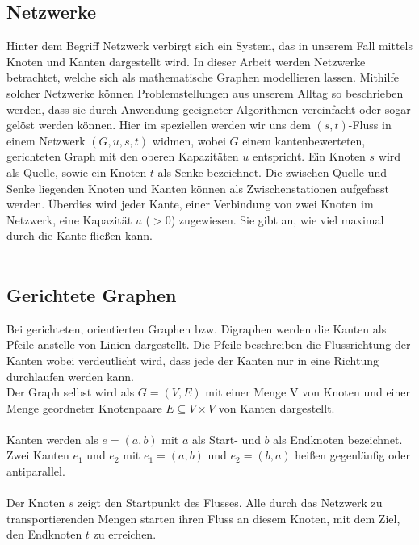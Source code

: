 \documentclass[a4paper]{llncs}
\begin{document}
\subsection{Netzwerke}
\label{Netzwerke}
Hinter dem Begriff Netzwerk verbirgt sich ein System, das in unserem Fall mittels Knoten und Kanten dargestellt wird. In dieser Arbeit werden Netz\-werke betrachtet, welche sich als mathematische Graphen modellieren lassen. Mithilfe solcher Netzwerke können Problemstellungen aus unserem Alltag so beschrieben werden, dass sie durch Anwendung geeigneter Algorithmen ver\-einfacht oder sogar gelöst werden können. Hier im speziellen werden wir uns dem $(s,t)$-Fluss in einem Netzwerk $(G,u,s,t)$ widmen, wobei  $G$ einem kanten\-bewerteten, gerichteten Graph mit den oberen Kapazitäten $u$ entspricht. Ein Knoten $s$ wird als Quelle, sowie ein Knoten $t$ als Senke bezeichnet. Die zwischen Quelle und Senke liegenden Knoten und Kanten können als Zwischenstationen aufgefasst werden. Überdies wird jeder Kante, einer Verbindung von zwei Knoten im Netzwerk, eine Kapazität $u$ ($>0$) zugewiesen. Sie gibt an, wie viel maximal durch die Kante fließen kann.\\ \\
\citep{Optimierungsmodell}

\subsection{Gerichtete Graphen}
\label{Graph}
Bei gerichteten, orientierten Graphen bzw. Digraphen werden die Kanten als Pfeile anstelle von Linien dargestellt. Die Pfeile beschreiben die Flussrichtung der Kanten wobei verdeutlicht wird, dass jede der Kanten nur in eine Richtung durchlaufen werden kann.\\

Der Graph selbst wird als
$G = (V,E)$ mit einer Menge V von Knoten und einer Menge
geordneter Knotenpaare $E \subseteq V \times V$ von Kanten dargestellt.\\ \\
Kanten werden als 
$e = (a,b)$
mit $a$ als Start- und $b$ als Endknoten bezeichnet.
Zwei Kanten $e_{1}$ und $e_{2}$ mit 
$e_{1} = (a,b)$ und $e_{2} = (b,a)$
heißen gegenläufig oder antiparallel.\\ \\
Der Knoten $s$ zeigt den Startpunkt des Flusses. Alle durch das Netzwerk zu transportierenden Mengen starten ihren Fluss an diesem Knoten, mit dem Ziel, den Endknoten $t$ zu erreichen.\\ 
\end{document}
